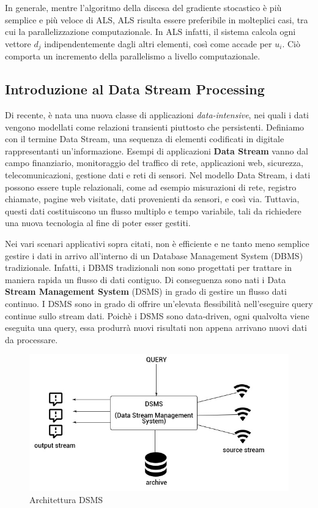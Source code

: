 \documentclass[12pt]{article}
\begin{document}
In generale, mentre l'algoritmo della discesa del gradiente stocastico è più semplice e più veloce di ALS, ALS risulta essere preferibile in molteplici casi, tra cui la parallelizzazione computazionale. In ALS infatti, il sistema calcola ogni vettore $d_j$ indipendentemente dagli altri elementi, così come accade per $u_i$. Ciò comporta un incremento della parallelismo a livello computazionale.

\subsection{Introduzione al Data Stream Processing}
Di recente, è nata una nuova classe di applicazioni \textit{data-intensive}, nei quali i dati vengono modellati come relazioni transienti piuttosto che persistenti. Definiamo con il termine Data Stream, una sequenza di elementi codificati in digitale rappresentanti un'informazione. Esempi di applicazioni \textbf{Data Stream} vanno dal campo finanziario, monitoraggio del traffico di rete, applicazioni web, sicurezza, telecomunicazioni, gestione dati e reti di sensori. Nel modello Data Stream, i dati possono essere tuple relazionali, come ad esempio misurazioni di rete, registro chiamate, pagine web visitate, dati provenienti da sensori, e così via. Tuttavia, questi dati costituiscono un flusso multiplo e tempo variabile, tali da richiedere una nuova tecnologia al fine di poter esser gestiti.

Nei vari scenari applicativi sopra citati, non è efficiente e ne tanto meno semplice gestire i dati in arrivo all'interno di un Database Management System (DBMS) tradizionale. Infatti, i DBMS tradizionali non sono progettati per trattare in maniera rapida un flusso di dati contiguo. Di conseguenza sono nati i Data \textbf{Stream Management System} (DSMS) in grado di gestire un flusso dati continuo. I DSMS sono in grado di offrire un'elevata flessibilità nell'eseguire query continue sullo stream dati. Poichè i DSMS sono data-driven, ogni qualvolta viene eseguita una query, essa produrrà nuovi risultati non appena arrivano nuovi dati da processare.

\begin{figure}[H]
	\centering
	\includegraphics[scale=0.50]{images/dsms.jpg}
	\caption{Architettura DSMS}
	\label{dsms}
\end{figure}
\end{document}
